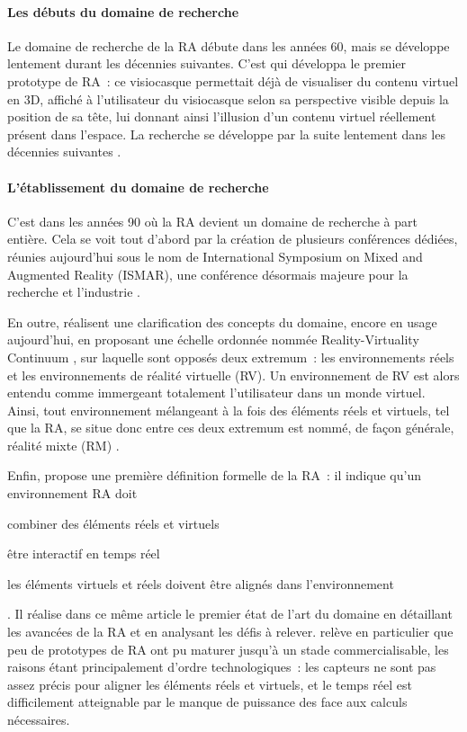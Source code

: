 \paragraph*{Les débuts du domaine de recherche}
Le domaine de recherche de la RA débute dans les années 60, mais se développe lentement durant les décennies suivantes. C'est \citet{Sutherland1968} qui développa le premier prototype de RA~: ce visiocasque permettait déjà de visualiser du contenu virtuel en 3D, affiché à l'utilisateur du visiocasque selon sa perspective visible depuis la position de sa tête, lui donnant ainsi l'illusion d'un contenu virtuel réellement présent dans l'espace. La recherche se développe par la suite lentement dans les décennies suivantes \citep{VanKrevelenPoelman2010} \citep{CarmignianiFurhtAnisettiEtAl2011}.

\paragraph*{L'établissement du domaine de recherche}
C'est dans les années 90 où la RA devient un domaine de recherche à part entière. Cela se voit tout d'abord par la création de plusieurs conférences dédiées, réunies aujourd'hui sous le nom de International Symposium on Mixed and Augmented Reality (ISMAR), une conférence désormais majeure pour la recherche et l'industrie \citep{AzumaBaillotBehringerEtAl2001}.

En outre, \citet{MilgramKishino1994} réalisent une clarification des concepts du domaine, encore en usage aujourd'hui, en proposant une échelle ordonnée nommée \foreignlanguage{english}{Reality-Virtuality Continuum} , sur laquelle sont opposés deux extremum~: les environnements réels et les environnements de réalité virtuelle (RV). Un environnement de RV est alors entendu comme immergeant totalement l'utilisateur dans un monde virtuel. Ainsi, tout environnement mélangeant à la fois des éléments réels et virtuels, tel que la RA, se situe donc entre ces deux extremum est nommé, de façon générale, réalité mixte (RM) \citep{MilgramKishino1994}.

Enfin, \citet{Azuma1997} propose une première définition formelle de la RA~: il indique qu'un environnement RA doit 
\begin{enumerate*}[label=\emph{\arabic*})]
\item combiner des éléments réels et virtuels
\item être interactif en temps réel
\item les éléments virtuels et réels doivent être alignés dans l'environnement
\end{enumerate*}. Il réalise dans ce même article le premier état de l'art du domaine en détaillant les avancées de la RA et en analysant les défis à relever. \citet{Azuma1997} relève en particulier que peu de prototypes de RA ont pu maturer jusqu'à un stade commercialisable, les raisons étant principalement d'ordre technologiques~: les capteurs ne sont pas assez précis pour aligner les éléments réels et virtuels, et le temps réel est difficilement atteignable par le manque de puissance des face aux calculs nécessaires.

